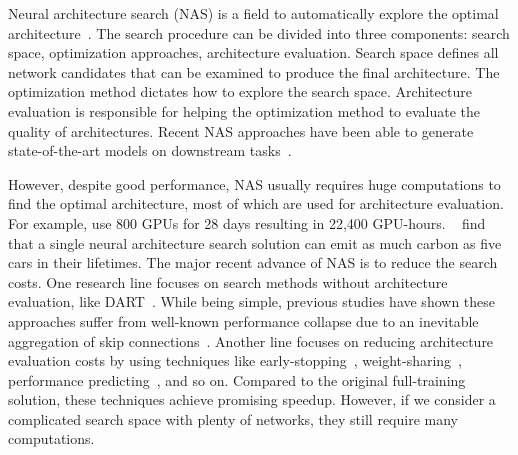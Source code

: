 
Neural architecture search (NAS) is a field to automatically explore the optimal architecture~\citep{DBLP:conf/iclr/ZophL17,DBLP:conf/iclr/BakerGNR17}. The search procedure can be divided into three components: search space, optimization approaches, architecture evaluation. Search space defines all network candidates that can be examined to produce the final
architecture. The optimization method dictates how to explore the search space. Architecture evaluation is responsible for helping the optimization method to evaluate the quality of architectures. Recent NAS approaches have been able to generate state-of-the-art models on downstream tasks~\cite{zoph2018learning,tan2019efficientnet}. 

However, despite good performance, NAS usually requires huge computations to find the optimal architecture, most of which are used for architecture evaluation. For example, \citet{DBLP:conf/iclr/ZophL17} use 800
GPUs for 28 days resulting in 22,400 GPU-hours. ~\citet{DBLP:conf/acl/StrubellGM19} find that a single neural architecture search solution can emit as much carbon as five cars in their lifetimes.  The major recent advance of NAS is to reduce the search costs. One research line focuses on search methods without architecture evaluation, like DART~\citep{DBLP:conf/iclr/LiuSY19,chu2020fair}.  While being simple, previous studies have shown these approaches suffer from well-known performance collapse due to an inevitable aggregation of skip connections~\citep{DBLP:conf/icml/YingKCR0H19,DBLP:conf/eccv/ChuZZL20}. Another line focuses on reducing architecture evaluation costs by using techniques like early-stopping~\citep{liang2019darts}, weight-sharing~\citep{pham2018efficient}, performance predicting~\cite{DBLP:conf/eccv/LiuZNSHLFYHM18}, and so on.  Compared to the original full-training solution, these techniques achieve promising speedup. However, if we consider a complicated search space with plenty of networks, they still require many computations.




